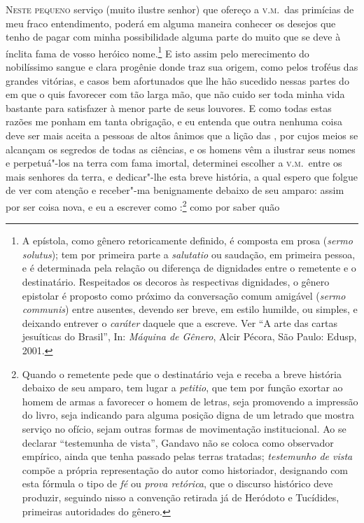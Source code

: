 \noindent\textsc{Neste pequeno} serviço (muito ilustre senhor) que ofereço a \textsc{v.m.}~das
primícias de meu fraco entendimento, poderá em alguma maneira conhecer os
desejos que tenho de pagar com minha possibilidade alguma parte do muito
que se deve à ínclita fama de vosso heróico nome.\footnote{ A epístola,
como gênero retoricamente definido, é composta em prosa (\textit{sermo
solutus}); tem por primeira parte a \textit{salutatio} ou saudação, em
primeira pessoa, e é determinada pela relação ou diferença de
dignidades entre o remetente e o destinatário. Respeitados os decoros
às respectivas dignidades, o gênero epistolar é proposto como próximo
da conversação comum amigável (\textit{sermo communis}) entre ausentes,
devendo ser breve, em estilo humilde, ou simples, e deixando entrever o
\textit{caráter} daquele que a escreve. Ver ``A arte das cartas jesuíticas do Brasil'', In: 
\textit{Máquina de Gênero}, Alcir Pécora, São Paulo: Edusp, 2001.} E isto assim pelo
merecimento do nobilíssimo sangue e clara progênie donde traz sua
origem, como pelos troféus das grandes vitórias, e casos bem
afortunados que lhe hão sucedido nessas partes do  em que  o
quis favorecer com tão larga mão, que não cuido ser toda minha vida
bastante para satisfazer à menor parte de seus louvores. E como todas
estas razões me ponham em tanta obrigação, e eu entenda que outra
nenhuma coisa deve ser mais aceita a pessoas de altos ânimos que a lição
das , por cujos meios se alcançam os segredos de todas as 	
ciências, e os homens vêm a ilustrar seus nomes e perpetuá"-los na terra
com fama imortal, determinei escolher a \textsc{v.m.}~entre os mais senhores da
terra, e dedicar"-lhe esta breve história, a qual espero que folgue de				%
ver com atenção e receber"-ma benignamente debaixo de seu amparo: assim
por ser coisa nova, e eu a escrever como :\footnote{ Quando 
o remetente pede que o destinatário veja e receba a breve
história debaixo de seu amparo, tem lugar a \textit{petitio}, que tem		
por função exortar ao homem de armas a favorecer o homem de letras,
seja promovendo a impressão do livro, seja indicando para alguma
posição digna de um letrado que mostra serviço no ofício, sejam outras
formas de movimentação institucional. Ao se declarar
``testemunha de vista'', Gandavo não se
coloca como observador empírico, ainda que tenha passado pelas terras
tratadas; \textit{testemunho de vista} compõe a própria representação
do autor como historiador, designando com esta fórmula o tipo de
\textit{fé} ou \textit{prova retórica}, que o discurso histórico deve
produzir, seguindo nisso a convenção retirada já de Heródoto e
Tucídides, primeiras autoridades do gênero.} como por saber quão
